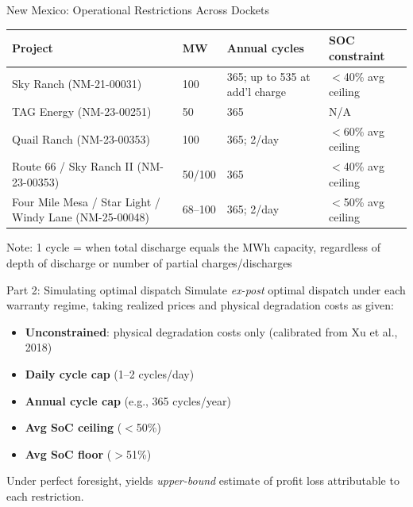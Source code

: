 \documentclass[aspectratio=169]{beamer}
\begin{document}
\begin{frame}{New Mexico: Operational Restrictions Across Dockets}
\footnotesize
\begin{tabular}{p{5cm} p{1.4cm} p{3.0cm} p{3.5cm}}
\toprule
\textbf{Project} & \textbf{MW} & \textbf{Annual cycles} & \textbf{SOC constraint} \\
\midrule
Sky Ranch (NM-21-00031) & 100 & 365; up to 535 at add'l charge & $<$40\% avg ceiling  \\
\addlinespace
TAG Energy (NM-23-00251) & 50 & 365 & N/A \\
\addlinespace
Quail Ranch (NM-23-00353) & 100 & 365; 2/day & $<$60\% avg ceiling \\
\addlinespace
Route 66 / Sky Ranch II (NM-23-00353) & 50/100 & 365 & $<$40\% avg ceiling  \\
\addlinespace
Four Mile Mesa / Star Light / Windy Lane (NM-25-00048) & 68--100 & 365; 2/day & $<$50\% avg ceiling \\
\bottomrule
\end{tabular}

\vspace{0.3cm}
Note: 1 cycle = when total discharge equals the MWh capacity, regardless of depth of discharge or number of partial charges/discharges


\end{frame}

\begin{frame}{Part 2: Simulating optimal dispatch}
Simulate \textit{ex-post} optimal dispatch under each warranty regime, taking realized prices and physical degradation costs as given:
\vspace{0.2cm}
\begin{itemize}
    \item \textbf{Unconstrained}: physical degradation costs only (calibrated from Xu et al., 2018)
    \item \textbf{Daily cycle cap} (1--2 cycles/day)
    \item \textbf{Annual cycle cap} (e.g., 365 cycles/year)
    \item \textbf{Avg SoC ceiling} ($<$50\%)
    \item \textbf{Avg SoC floor} ($>$51\%)
\end{itemize}

\vspace{0.3cm}
Under perfect foresight, yields \textit{upper-bound} estimate of profit loss attributable to each restriction.
\end{frame}
\end{document}
